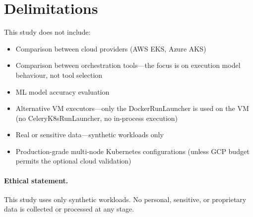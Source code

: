
\section{Delimitations}
\label{sec:delimitations}

This study does not include:

\begin{itemize}
  \item Comparison between cloud providers (AWS EKS, Azure AKS)
  \item Comparison between orchestration tools---the focus is on execution model behaviour, not tool selection
  \item ML model accuracy evaluation
  \item Alternative VM executors---only the DockerRunLauncher is used on the VM (no CeleryK8sRunLauncher, no in-process execution)
  \item Real or sensitive data---synthetic workloads only
  \item Production-grade multi-node Kubernetes configurations (unless GCP budget permits the optional cloud validation)
\end{itemize}

\paragraph{Ethical statement.}
This study uses only synthetic workloads. No personal, sensitive, or proprietary data is collected or processed at any stage.
